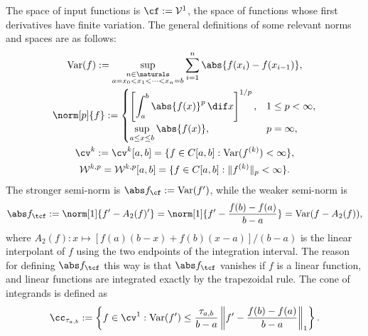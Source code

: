 The space of input functions is $\cf:=\mathcal{V}^{1}$, the space of functions whose first derivatives have finite variation.  The general definitions of some relevant norms and spaces are as follows:
\begin{subequations} \label{defSobolev}
\begin{gather}
\Var(f) := \sup_{\substack{n \in \naturals\\ a = x_0 < x_1 < \cdots < x_{n} =b}} \sum_{i=1}^n \abs{f(x_i)-f(x_{i-1})}, \\
\norm[p]{f}:= \begin{cases} \displaystyle \left[\int_a^b \abs{f(x)}^p \, \dif x \right]^{1/p}, & 1 \le p < \infty,\\[1ex]
\displaystyle  \sup_{a \le x \le b} \abs{f(x)}, & p=\infty,
\end{cases}
\\
\cv^{k}: =\cv^{k}[a,b]=\{f\in C[a,b]: \Var(f^{(k)}) < \infty \}, \\
\mathcal{W}^{k,p}=\mathcal{W}^{k,p}[a,b]=\{f\in C[a,b]: \|f^{(k)}\|_{p}<\infty\}.
\end{gather}
\end{subequations}
The stronger semi-norm is $\Fnorm{f}:=\Var(f')$, while the weaker semi-norm is
\[
\Ftnorm{f}:=\norm[1]{f'-A_2(f)'}=\norm[1]{f'-\frac{f(b)-f(a)}{b-a}}=\Var(f-A_2(f)),
\]
where $A_2(f): x \mapsto [f(a)(b-x)+f(b)(x-a)]/(b-a)$ is the linear interpolant of $f$ using the two endpoints of the integration interval. The reason for defining $\Ftnorm{f}$ this way is that $\Ftnorm{f}$ vanishes if $f$ is a linear function, and linear functions are integrated exactly by the trapezoidal rule.  The cone of integrands is defined as
\begin{equation}\label{coneinteg}
\cc_{\tau_{a,b}}:=\left\{f\in \cv^{1}:\Var(f')\leq\frac{\tau_{a,b}}{b-a}\left\|f'-\frac{f(b)-f(a)}{b-a}\right\|_1\right\}.
\end{equation}

